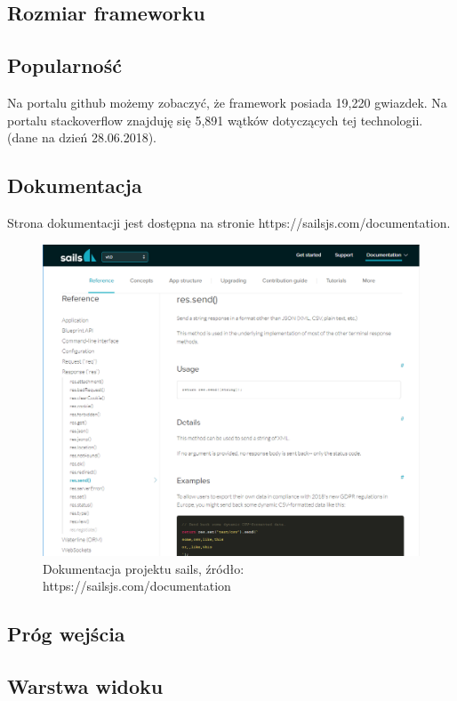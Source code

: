 \documentclass[12pt]{report}
\begin{document}
    \subsection{Rozmiar frameworku}
    \subsection{Popularność}
      Na portalu github możemy zobaczyć, że framework posiada 19,220 gwiazdek.
      Na portalu stackoverflow znajduję się 5,891 wątków dotyczących tej technologii.
      (dane na dzień 28.06.2018).

    \subsection{Dokumentacja}
      Strona dokumentacji jest dostępna na stronie https://sailsjs.com/documentation.
      \begin{figure}[!hb]
        \centering
        \includegraphics[width=\textwidth,height=\textheight,keepaspectratio]{doc_sails.png} 
        \caption{Dokumentacja projektu sails, źródło: https://sailsjs.com/documentation}
      \end{figure}

    \subsection{Próg wejścia}
    \subsection{Warstwa widoku}
\end{document}
